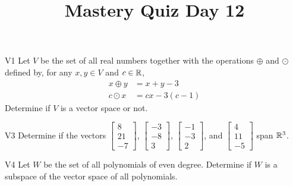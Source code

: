 \documentclass{sbgLAquiz}
\title{Mastery Quiz Day 12 }
\begin{document}
\begin{problem}{V1}
Let $V$ be the  set of all real numbers together with the operations $\oplus$ and $\odot$ defined by, for any $x,y \in V$ and $c \in \mathbb{R}$,
\begin{align*}
x\oplus y  &= x+y-3 \\
c \odot x &= cx-3(c-1)
\end{align*}
Determine if $V$ is a vector space or not.
\end{problem}

\begin{problem}{V3}
Determine if the vectors  $\begin{bmatrix} 8 \\ 21 \\ -7 \end{bmatrix}$, $\begin{bmatrix} -3 \\ -8 \\ 3 \end{bmatrix}$, $\begin{bmatrix} -1 \\ -3 \\ 2 \end{bmatrix}$, and $\begin{bmatrix} 4 \\ 11 \\ -5 \end{bmatrix}$ span $\mathbb{R}^3$.
\end{problem}
\newpage

\begin{problem}{V4} Let $W$ be the set of all polynomials of even degree.  Determine if $W$ is a subspace of the vector space of all polynomials.
\end{problem}
\end{document}
